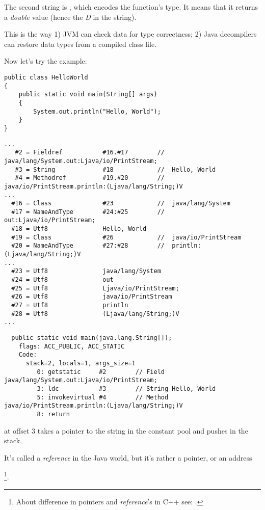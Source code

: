 The second string is , which encodes the function's type.
It means that it returns a \emph{double} value (hence the \emph{D} in the string).

This is the way 
1) JVM can check data for type correctness; 
2) Java decompilers can restore data types from a compiled class file.


Now let's try the  example:


\begin{lstlisting}[style=customjava]
public class HelloWorld
{
	public static void main(String[] args)
	{
		System.out.println("Hello, World");
	}
}
\end{lstlisting}

\begin{lstlisting}[caption=Constant pool]
...
   #2 = Fieldref           #16.#17        //  java/lang/System.out:Ljava/io/PrintStream;
   #3 = String             #18            //  Hello, World
   #4 = Methodref          #19.#20        //  java/io/PrintStream.println:(Ljava/lang/String;)V
...
  #16 = Class              #23            //  java/lang/System
  #17 = NameAndType        #24:#25        //  out:Ljava/io/PrintStream;
  #18 = Utf8               Hello, World
  #19 = Class              #26            //  java/io/PrintStream
  #20 = NameAndType        #27:#28        //  println:(Ljava/lang/String;)V
...
  #23 = Utf8               java/lang/System
  #24 = Utf8               out
  #25 = Utf8               Ljava/io/PrintStream;
  #26 = Utf8               java/io/PrintStream
  #27 = Utf8               println
  #28 = Utf8               (Ljava/lang/String;)V
...
\end{lstlisting}

\begin{lstlisting}
  public static void main(java.lang.String[]);
    flags: ACC_PUBLIC, ACC_STATIC
    Code:
      stack=2, locals=1, args_size=1
         0: getstatic     #2        // Field java/lang/System.out:Ljava/io/PrintStream;
         3: ldc           #3        // String Hello, World
         5: invokevirtual #4        // Method java/io/PrintStream.println:(Ljava/lang/String;)V
         8: return        
\end{lstlisting}

 at offset 3 takes a pointer to the  string in the constant pool
and pushes in the stack.

It's called a \emph{reference} in the Java world, but it's rather a pointer, or an address

\footnote{About difference in pointers and \emph{reference}'s in C++ see: .}.

